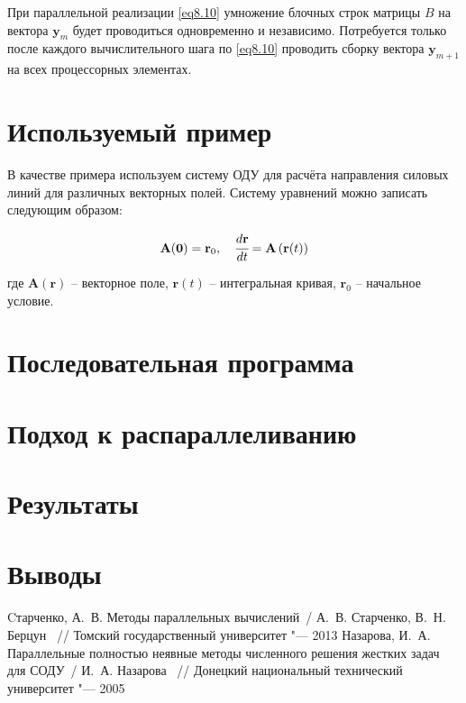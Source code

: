 \documentclass[14pt,final,titlepage,pscyr]{hedwork}
\renewcommand{\vec}[1]{\mathbf{#1}}
\begin{document}
	При параллельной реализации \eqref{eq8.10} умножение блочных строк матрицы \( B \) на вектора 
	\( \vec{y}_m \) будет проводиться одновременно и независимо. Потребуется только после каждого 
	вычислительного шага по \eqref{eq8.10} проводить сборку вектора \( \vec{y}_{m+1} \) на всех процессорных 
	элементах.\cite{methods}

\section{Используемый пример}
В качестве примера используем систему ОДУ для расчёта направления силовых линий для различных векторных 
полей. Систему уравнений можно записать следующим образом:

\[
	\vec{A}(\vec{0}) = \vec{r}_0, \quad \cfrac{d\vec{r}}{dt} = \vec{A}\left( \vec{r}(t) \right)
\]

где \( \vec{A}(\vec{r}) \) -- векторное поле, \( \vec{r}(t) \) -- интегральная кривая, 
\( \vec{r}_0 \) -- начальное условие.

\section{Последовательная программа}
\section{Подход к распараллеливанию}
\section{Результаты}
\section{Выводы}

\newpage

\renewcommand{\bibname}{Список используемой литературы}
\begin{thebibliography}{10}
	 Cтарченко, А.~В. Методы параллельных вычислений~/ А.~В. Старченко, В.~Н. Берцун ~// 
		Томский государственный университет "--- 2013
	 Назарова, И.~А. Параллельные полностью неявные методы численного решения жестких 
		задач для СОДУ~/ И.~А. Назарова ~// Донецкий национальный технический университет "--- 2005
\end{thebibliography}
\end{document}
